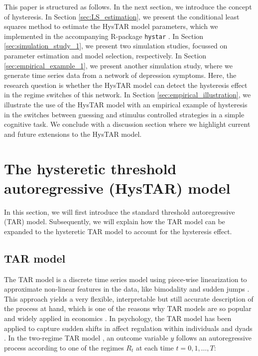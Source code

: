 \documentclass{article}
\begin{document}
This paper is structured as follows.
In the next section, we introduce the concept of hysteresis.
In Section \ref{sec:LS_estimation}, we present the conditional least squares method to estimate the HysTAR model parameters, which we implemented in the accompanying \textsf{R}-package \texttt{hystar} \citep{R, R_hystar}.
In Section \ref{sec:simulation_study_1}, we present two simulation studies, focussed on parameter estimation and model selection, respectively.
In Section \ref{sec:empirical_example_1}, we present another simulation study, where we generate time series data from a network of depression symptoms. Here, the research question is whether the HysTAR model can detect the hysteresis effect in the regime switches of this network.
In Section \ref{sec:empirical_illustration}, we illustrate the use of the HysTAR model with an empirical example of hysteresis in the switches between guessing and stimulus controlled strategies in a simple cognitive task.
We conclude with a discussion section where we highlight current and future extensions to the HysTAR model.

\section{The hysteretic threshold autoregressive (HysTAR) model} \label{sec:hystar}
In this section, we will first introduce the standard threshold autoregressive (TAR) model.
Subsequently, we will explain how the TAR model can be expanded to the hysteretic TAR model to account for the hysteresis effect.

\subsection{TAR model}
The TAR model is a discrete time series model using piece-wise linearization to approximate non-linear features in the data, like bimodality and sudden jumps \citep{tar}.
This approach yields a very flexible, interpretable but still accurate description of the process at hand, which is one of the reasons why TAR models are so popular and widely applied in economics \citep{tar_in_economics}.
In psychology, the TAR model has been applied to capture sudden shifts in affect regulation within individuals \citep{tar_affect_person1, tar_affect_person2} and dyads \citep{tar_affect_dyadic1, tar_affect_dyadic2}.
In the two-regime TAR model \citet{tar}, an outcome variable $y$ follows an autoregressive process according to one of the regimes $R_t$ at each time $t = 0, 1, \dots, T$:
\end{document}
